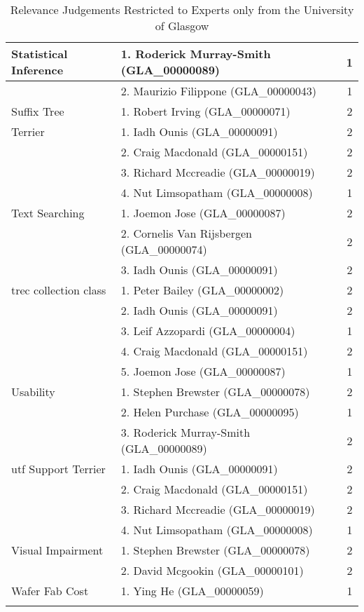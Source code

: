 \begin{longtable}{|l|l|c|}
\hline Statistical Inference & 1. Roderick Murray-Smith (GLA\_00000089) & 1 \\
\hline & 2. Maurizio Filippone (GLA\_00000043) & 1 \\
\hline Suffix Tree & 1. Robert Irving (GLA\_00000071) & 2 \\
\hline Terrier & 1. Iadh Ounis (GLA\_00000091) & 2 \\
\hline & 2. Craig Macdonald (GLA\_00000151) & 2 \\
\hline & 3. Richard Mccreadie (GLA\_00000019) & 2 \\
\hline & 4. Nut Limsopatham (GLA\_00000008) & 1 \\
\hline Text Searching & 1. Joemon Jose (GLA\_00000087) & 2 \\
\hline & 2. Cornelis Van Rijsbergen (GLA\_00000074) & 2 \\
\hline & 3. Iadh Ounis (GLA\_00000091) & 2 \\
\hline trec collection class & 1. Peter Bailey (GLA\_00000002) & 2 \\
\hline & 2. Iadh Ounis (GLA\_00000091) & 2 \\
\hline & 3. Leif Azzopardi (GLA\_00000004) & 1 \\
\hline & 4. Craig Macdonald (GLA\_00000151) & 2 \\
\hline & 5. Joemon Jose (GLA\_00000087) & 1 \\
\hline Usability & 1. Stephen Brewster (GLA\_00000078) & 2 \\
\hline & 2. Helen Purchase (GLA\_00000095) & 1 \\
\hline & 3. Roderick Murray-Smith (GLA\_00000089) & 2 \\
\hline utf Support Terrier & 1. Iadh Ounis (GLA\_00000091) & 2\\
\hline & 2. Craig Macdonald (GLA\_00000151) & 2 \\
\hline & 3. Richard Mccreadie (GLA\_00000019) & 2 \\
\hline & 4. Nut Limsopatham (GLA\_00000008) & 1 \\
\hline Visual Impairment & 1. Stephen Brewster (GLA\_00000078) & 2 \\
\hline & 2. David Mcgookin (GLA\_00000101) & 2 \\
\hline Wafer Fab Cost & 1. Ying He (GLA\_00000059) & 1 \\

\hline

\caption{Relevance Judgements Restricted to Experts only from the University of Glasgow} \label{table:uogQueries}
\end{longtable}
\normalsize




